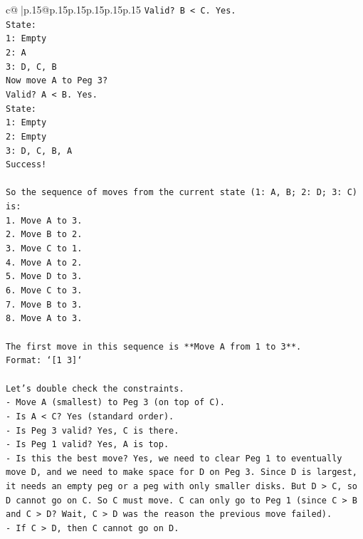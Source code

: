 \documentclass{article}
\begin{document}
{\begin{supertabular}{c@{$\;$}|p{.15\linewidth}@{}p{.15\linewidth}p{.15\linewidth}p{.15\linewidth}p{.15\linewidth}p{.15\linewidth}}
{{{\texttt{Valid? B < C. Yes.} \\
\texttt{State:} \\
\texttt{1: Empty} \\
\texttt{2: A} \\
\texttt{3: D, C, B} \\
\texttt{Now move A to Peg 3?} \\
\texttt{Valid? A < B. Yes.} \\
\texttt{State:} \\
\texttt{1: Empty} \\
\texttt{2: Empty} \\
\texttt{3: D, C, B, A} \\
\texttt{Success!} \\
\\ 
\texttt{So the sequence of moves from the current state (1: A, B; 2: D; 3: C) is:} \\
\texttt{1. Move A to 3.} \\
\texttt{2. Move B to 2.} \\
\texttt{3. Move C to 1.} \\
\texttt{4. Move A to 2.} \\
\texttt{5. Move D to 3.} \\
\texttt{6. Move C to 3.} \\
\texttt{7. Move B to 3.} \\
\texttt{8. Move A to 3.} \\
\\ 
\texttt{The first move in this sequence is **Move A from 1 to 3**.} \\
\texttt{Format: `{[}1 3{]}`} \\
\\ 
\texttt{Let's double check the constraints.} \\
\texttt{{-} Move A (smallest) to Peg 3 (on top of C).} \\
\texttt{{-} Is A < C? Yes (standard order).} \\
\texttt{{-} Is Peg 3 valid? Yes, C is there.} \\
\texttt{{-} Is Peg 1 valid? Yes, A is top.} \\
\texttt{{-} Is this the best move? Yes, we need to clear Peg 1 to eventually move D, and we need to make space for D on Peg 3. Since D is largest, it needs an empty peg or a peg with only smaller disks. But D > C, so D cannot go on C. So C must move. C can only go to Peg 1 (since C > B and C > D? Wait, C > D was the reason the previous move failed).} \\
\texttt{{-} If C > D, then C cannot go on D.} \\
}}}
\end{supertabular}}
\end{document}
